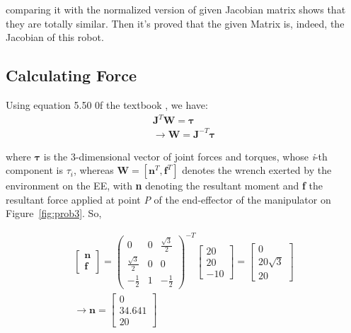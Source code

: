 \documentclass[conference]{IEEEtran}
\begin{document}
comparing it with the normalized version of given Jacobian matrix shows that they are totally similar. Then it's proved that the given Matrix is, indeed, the Jacobian of this robot.

\subsection{Calculating Force}
Using equation 5.50 0f the textbook \cite{b1}, we have:
\begin{gather}
    \mathbf{J}^T \mathbf{W} = \boldsymbol{\tau} \\
    \rightarrow \mathbf{W} = \mathbf{J}^{-T} \boldsymbol{\tau}
\end{gather}

where $\boldsymbol{\tau}$ is the 3-dimensional vector of joint forces and torques, whose \textit{i}-th component is $\tau_i$, whereas $\mathbf{W} = [\mathbf{n}^T , \mathbf{f}^T]$ denotes the wrench exerted by the environment on the EE, with \textbf{n} denoting the resultant moment and \textbf{f} the resultant force applied at point \textit{P} of the end-effector of the manipulator on Figure~\ref{fig:prob3}. So,

\begin{gather*}
    \begin{bmatrix}
        \mathbf{n} \\
        \mathbf{f}
    \end{bmatrix} = \left(\begin{array}{ccc} 0 & 0 & \frac{\sqrt{3}}{2}\\ \frac{\sqrt{3}}{2} & 0 & 0\\ -\frac{1}{2} & 1 & -\frac{1}{2} \end{array}\right)^{-T} \begin{bmatrix}
        20 \\
        20 \\
        -10
    \end{bmatrix} = \begin{bmatrix}
        0           \\
        20 \sqrt{3} \\
        20
    \end{bmatrix} \\
    \rightarrow \mathbf{n} = \begin{bmatrix}
        0      \\
        34.641 \\
        20
    \end{bmatrix}
\end{gather*}
\end{document}
